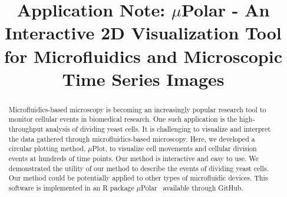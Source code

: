 \documentclass[conference]{IEEEtran}
\begin{document}
\title{ Application Note: $\mu$Polar \-- An Interactive 2D Visualization Tool for  Microfluidics and  Microscopic Time Series Images }


\maketitle

\begin{abstract}
Microfluidics-based microscopy is becoming an increasingly popular research tool to monitor cellular events in biomedical research. One such application is the high-throughput analysis of dividing yeast cells. It is challenging to visualize and interpret the data gathered through microfluidics-based microscopy. Here, we developed a circular plotting method, $\mu$Plot, to visualize cell movements and cellular division events at hundreds of time points. Our method is interactive and easy to use. We demonstrated the utility of our method to describe the events of dividing yeast cells. Our method could be potentially applied to other types of microfluidic devices. This software is implemented in an R package $\mu$Polar \ available through GitHub. 
\end{abstract}
\end{document}
